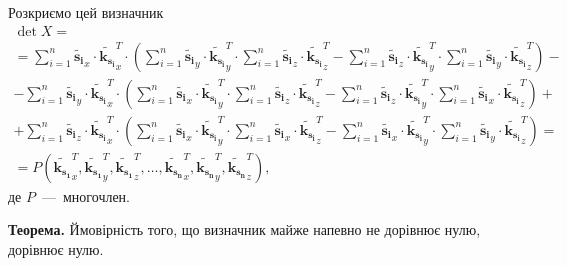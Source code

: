 Розкриємо цей визначник
\begin{equation*}
  \begin{gathered}
    \det{X} = \\
    = \sum \limits_{i = 1}^n \tilde{\boldsymbol{s_i}}_x \cdot \tilde{\boldsymbol{k_{s_i}}}_x^T \cdot \left(
      \sum \limits_{i = 1}^n \tilde{\boldsymbol{s_i}}_y \cdot \tilde{\boldsymbol{k_{s_i}}}_y^T \cdot
      \sum \limits_{i = 1}^n \tilde{\boldsymbol{s_i}}_z \cdot \tilde{\boldsymbol{k_{s_i}}}_z^T -
      \sum \limits_{i = 1}^n \tilde{\boldsymbol{s_i}}_z \cdot \tilde{\boldsymbol{k_{s_i}}}_y^T \cdot
      \sum \limits_{i = 1}^n \tilde{\boldsymbol{s_i}}_y \cdot \tilde{\boldsymbol{k_{s_i}}}_z^T \right) - \\
    - \sum \limits_{i = 1}^n \tilde{\boldsymbol{s_i}}_y \cdot \tilde{\boldsymbol{k_{s_i}}}_x^T \cdot \left(
      \sum \limits_{i = 1}^n \tilde{\boldsymbol{s_i}}_x \cdot \tilde{\boldsymbol{k_{s_i}}}_y^T \cdot
      \sum \limits_{i = 1}^n \tilde{\boldsymbol{s_i}}_z \cdot \tilde{\boldsymbol{k_{s_i}}}_z^T -
      \sum \limits_{i = 1}^n \tilde{\boldsymbol{s_i}}_z \cdot \tilde{\boldsymbol{k_{s_i}}}_y^T \cdot
      \sum \limits_{i = 1}^n \tilde{\boldsymbol{s_i}}_x \cdot \tilde{\boldsymbol{k_{s_i}}}_z^T \right) + \\
    + \sum \limits_{i = 1}^n \tilde{\boldsymbol{s_i}}_z \cdot \tilde{\boldsymbol{k_{s_i}}}_x^T \cdot \left(
      \sum \limits_{i = 1}^n \tilde{\boldsymbol{s_i}}_x \cdot \tilde{\boldsymbol{k_{s_i}}}_y^T \cdot
      \sum \limits_{i = 1}^n \tilde{\boldsymbol{s_i}}_x \cdot \tilde{\boldsymbol{k_{s_i}}}_z^T -
      \sum \limits_{i = 1}^n \tilde{\boldsymbol{s_i}}_x \cdot \tilde{\boldsymbol{k_{s_i}}}_y^T \cdot
      \sum \limits_{i = 1}^n \tilde{\boldsymbol{s_i}}_y \cdot \tilde{\boldsymbol{k_{s_i}}}_z^T \right) = \\
    = P \left(
      \tilde{\boldsymbol{k_{s_1}}}_x^T, \tilde{\boldsymbol{k_{s_1}}}_y^T, \tilde{\boldsymbol{k_{s_1}}}_z^T, \dotsc,
      \tilde{\boldsymbol{k_{s_n}}}_x^T, \tilde{\boldsymbol{k_{s_n}}}_y^T, \tilde{\boldsymbol{k_{s_n}}}_z^T
    \right),
  \end{gathered}
\end{equation*}
де $P$~---~многочлен.

\textbf{Теорема.}
Ймовірність того, що визначник майже напевно не дорівнює нулю,
дорівнює нулю.

